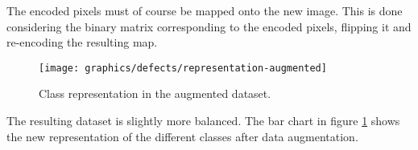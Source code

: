         \par{
            The encoded pixels must of course be mapped onto the new image. This is done considering the binary matrix corresponding to the encoded pixels, flipping it and re-encoding the resulting map.
        }
        \begin{figure}
            \texttt{[image: graphics/defects/representation-augmented]}
            \caption{Class representation in the augmented dataset.}\label{fig:defects:representation-augmented}
        \end{figure}
        \par{
            The resulting dataset is slightly more balanced. The bar chart in figure \ref{fig:defects:representation-augmented} shows the new representation of the different classes after data augmentation.
        }